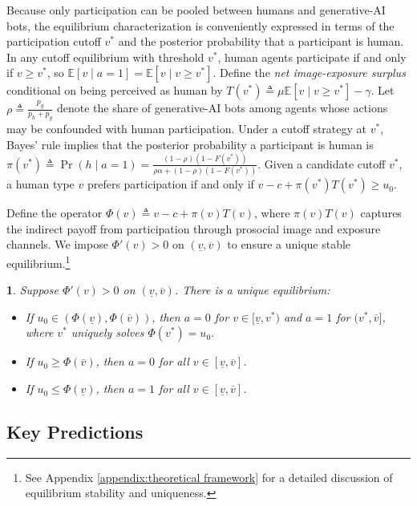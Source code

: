 \documentclass[12pt,notitlepage]{article}
\theoremstyle{plain}
\theoremstyle{plain}
\theoremstyle{definition}
\theoremstyle{definition}
\theoremstyle{assumption}
\theoremstyle{plain}
\theoremstyle{plain}
\theoremstyle{plain}
\newtheorem{proposition}{\protect\propositionname}
\theoremstyle{plain}
\theoremstyle{definition}%
\theoremstyle{plain}
\theoremstyle{plain}
\theoremstyle{plain}
\theoremstyle{plain}
\providecommand{\propositionname}{Proposition}
\DeclareMathOperator{\prob}{Pr}
\begin{document}
Because only participation can be pooled between humans and generative-AI bots, the equilibrium characterization is conveniently expressed in terms of the participation cutoff $v^*$ and the posterior probability that a participant is human. In any cutoff equilibrium with threshold $v^*$, human agents participate if and only if $v\geq v^*$, so $\mathbb{E}[v\mid a=1] = \mathbb{E}[v\mid v\geq v^*]$. Define the \textit{net image-exposure surplus} conditional on being perceived as human by $T(v^*)\triangleq \mu \mathbb{E}[v\mid v\geq v^*] - \gamma$. Let $\rho\triangleq\frac{p_g}{p_h+p_g}$ denote the share of generative-AI bots among agents whose actions may be confounded with human participation. Under a cutoff strategy at $v^*$, Bayes' rule implies that the posterior probability a participant is human is $\pi(v^*)\triangleq \prob(h\mid a=1) =  \frac{(1-\rho)(1-F(v^*))}{\rho \alpha + (1-\rho)(1-F(v^*))}$. Given a candidate cutoff $v^*$, a human type $v$ prefers participation if and only if $v-c+\pi(v^*)T(v^*)\geq u_0$. 


Define the operator $\Phi(v)\triangleq v - c + \pi(v)T(v)$, where $\pi(v)T(v)$ captures the indirect payoff from participation through prosocial image and exposure channels. We impose $\Phi'(v)>0$ on $(\underline v,\overline v)$ to ensure a unique stable equilibrium.\footnote{See Appendix \ref{appendix:theoretical framework} for a detailed discussion of equilibrium stability and uniqueness.}

\begin{proposition}\label{prop:equilibrium}
    Suppose $\Phi'(v)>0$ on $(\underline v,\overline v)$. There is a unique equilibrium:
    \begin{itemize}
        \item[(i)] If $u_0\in(\Phi(\underline{v}),\Phi(\overline{v}))$, then $a=0$ for $v\in[\underline{v},v^*)$ and $a=1$ for $(v^*,\overline{v}]$, where $v^*$ uniquely solves $\Phi(v^*)=u_0$.
        \item[(ii)] If $u_0\geq\Phi(\overline{v})$, then $a=0$ for all $v\in[\underline{v},\overline{v}]$.
        \item[(iii)] If $u_0\leq \Phi(\underline{v})$, then $a=1$ for all $v\in[\underline{v},\overline{v}]$.
    \end{itemize}
\end{proposition}


\subsection{Key Predictions} \label{subsec:predictions}
\end{document}
